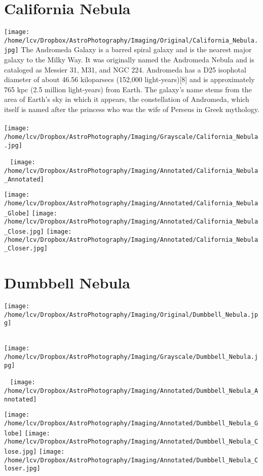 \section{California Nebula}
\texttt{[image: /home/lcv/Dropbox/AstroPhotography/Imaging/Original/California\_Nebula.jpg]}
{\footnotesize\color{white}
The Andromeda Galaxy is a barred spiral galaxy and is the nearest major galaxy to the Milky Way. It was originally named the Andromeda Nebula and is cataloged as Messier 31, M31, and NGC 224. Andromeda has a D25 isophotal diameter of about 46.56 kiloparsecs (152,000 light-years)[8] and is approximately 765 kpc (2.5 million light-years) from Earth. The galaxy's name stems from the area of Earth's sky in which it appears, the constellation of Andromeda, which itself is named after the princess who was the wife of Perseus in Greek mythology. 
}\ \\
\texttt{[image: /home/lcv/Dropbox/AstroPhotography/Imaging/Grayscale/California\_Nebula.jpg]}
\begin{center}
 \ \newpage
\texttt{[image: /home/lcv/Dropbox/AstroPhotography/Imaging/Annotated/California\_Nebula\_Annotated]}

\texttt{[image: /home/lcv/Dropbox/AstroPhotography/Imaging/Annotated/California\_Nebula\_Globe]}
\texttt{[image: /home/lcv/Dropbox/AstroPhotography/Imaging/Annotated/California\_Nebula\_Close.jpg]}
\texttt{[image: /home/lcv/Dropbox/AstroPhotography/Imaging/Annotated/California\_Nebula\_Closer.jpg]}
\end{center}
\section{Dumbbell Nebula}
\texttt{[image: /home/lcv/Dropbox/AstroPhotography/Imaging/Original/Dumbbell\_Nebula.jpg]}
{\footnotesize\color{white}

}\ \\
\texttt{[image: /home/lcv/Dropbox/AstroPhotography/Imaging/Grayscale/Dumbbell\_Nebula.jpg]}
\begin{center}
 \ \newpage
\texttt{[image: /home/lcv/Dropbox/AstroPhotography/Imaging/Annotated/Dumbbell\_Nebula\_Annotated]}

\texttt{[image: /home/lcv/Dropbox/AstroPhotography/Imaging/Annotated/Dumbbell\_Nebula\_Globe]}
\texttt{[image: /home/lcv/Dropbox/AstroPhotography/Imaging/Annotated/Dumbbell\_Nebula\_Close.jpg]}
\texttt{[image: /home/lcv/Dropbox/AstroPhotography/Imaging/Annotated/Dumbbell\_Nebula\_Closer.jpg]}
\end{center}
